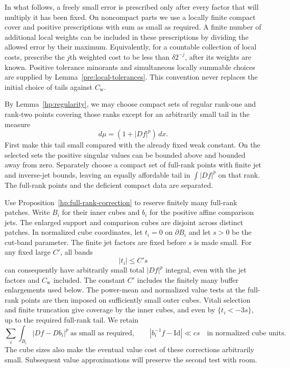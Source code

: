 \documentclass[11pt]{article}
\numberwithin{equation}{section}
\theoremstyle{definition}
\theoremstyle{remark}
\begin{document}
In what follows, a freely small error is prescribed only after every
factor that will multiply it has been fixed.  On noncompact parts we
use a locally finite compact cover and positive prescriptions with
sum as small as required.  A finite number of additional local weights
can be included in these prescriptions by dividing the allowed error
by their maximum.  Equivalently, for a countable collection of local
costs, prescribe the $j$th weighted cost to be less than
$\delta 2^{-j}$, after its weights are known.  Positive tolerance minorants and simultaneous locally summable
choices are supplied by Lemma~\ref{pre:local-tolerances}.  This
convention never replaces the initial choice of tails against
$C_{\mathrm w}$.

By Lemma~\ref{hp:regularity}, we may choose compact sets of regular
rank-one and rank-two points covering those ranks except for an
arbitrarily small tail in the measure
\[
                         d\mu=(1+|Df|^p)\,dx.
\]
First make this tail small compared with the already fixed weak
constant.  On the selected sets the positive singular values can be
bounded above and bounded away from zero.  Separately choose a compact
set of full-rank points with finite jet and inverse-jet bounds,
leaving an equally affordable tail in $\int |Df|^p$ on that rank.
The full-rank points and the deficient compact data are separated.

Use Proposition~\ref{hp:full-rank-correction} to reserve finitely many
full-rank patches.  Write $B_i$ for their inner cubes and $b_i$ for
the positive affine comparison jets.  The enlarged support and
comparison cubes are disjoint across distinct patches.
In normalized cube coordinates,
let $t_i=0$ on $\partial B_i$ and let $s>0$ be the cut-band parameter.
The finite jet factors are fixed before $s$ is made small.  For any
fixed large $C'$, all bands
\begin{equation}\label{ha:full-bands}
                         |t_i|\le C's
\end{equation}
can consequently have arbitrarily small total $|Df|^p$ integral,
even with the jet factors and $C_{\mathrm w}$ included.  The constant
$C'$ includes the finitely many buffer enlargements used below.
The power-mean and normalized value tests at the full-rank points
are then imposed on sufficiently small outer cubes.  Vitali selection
and finite truncation give coverage by the inner cubes, and even by
$\{t_i<-3s\}$, up to the required full-rank tail.  We retain
\begin{equation}\label{ha:affine-full-tests}
 \sum_i\int_{B_i}|Df-Db_i|^p\ \text{as small as required},
 \qquad
 |b_i^{-1}f-\mathrm{Id}|\ll cs
 \quad\text{in normalized cube units}.
\end{equation}
The cube sizes also make the eventual value cost of these corrections
arbitrarily small.  Subsequent value approximations will preserve
the second test with room.
\end{document}
